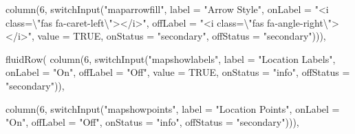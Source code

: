 \documentclass[
]{article}
\newenvironment{Shaded}{\begin{snugshade}}{\end{snugshade}}
\newcommand{\AttributeTok}[1]{\textcolor[rgb]{0.77,0.63,0.00}{#1}}
\newcommand{\ConstantTok}[1]{\textcolor[rgb]{0.00,0.00,0.00}{#1}}
\newcommand{\DecValTok}[1]{\textcolor[rgb]{0.00,0.00,0.81}{#1}}
\newcommand{\FunctionTok}[1]{\textcolor[rgb]{0.00,0.00,0.00}{#1}}
\newcommand{\NormalTok}[1]{#1}
\newcommand{\SpecialCharTok}[1]{\textcolor[rgb]{0.00,0.00,0.00}{#1}}
\newcommand{\StringTok}[1]{\textcolor[rgb]{0.31,0.60,0.02}{#1}}
\begin{document}
\begin{Shaded}
\begin{Highlighting}[]
                                        \FunctionTok{column}\NormalTok{(}\DecValTok{6}\NormalTok{, }\FunctionTok{switchInput}\NormalTok{(}\StringTok{"maparrowfill"}\NormalTok{,}
                                                              \AttributeTok{label =} \StringTok{"Arrow Style"}\NormalTok{,}
                                                              \AttributeTok{onLabel =} \StringTok{"\textless{}i class=}\SpecialCharTok{\textbackslash{}"}\StringTok{fas fa{-}caret{-}left}\SpecialCharTok{\textbackslash{}"}\StringTok{\textgreater{}\textless{}/i\textgreater{}"}\NormalTok{,}
                                                              \AttributeTok{offLabel =} \StringTok{"\textless{}i class=}\SpecialCharTok{\textbackslash{}"}\StringTok{fas fa{-}angle{-}right}\SpecialCharTok{\textbackslash{}"}\StringTok{\textgreater{}\textless{}/i\textgreater{}"}\NormalTok{,}
                                                              \AttributeTok{value =} \ConstantTok{TRUE}\NormalTok{,}
                                                              \AttributeTok{onStatus =} \StringTok{"secondary"}\NormalTok{,}
                                                              \AttributeTok{offStatus =} \StringTok{"secondary"}\NormalTok{))),}

                                      \FunctionTok{fluidRow}\NormalTok{(}
                                        \FunctionTok{column}\NormalTok{(}\DecValTok{6}\NormalTok{, }\FunctionTok{switchInput}\NormalTok{(}\StringTok{"mapshowlabels"}\NormalTok{,}
                                                              \AttributeTok{label =} \StringTok{"Location Labels"}\NormalTok{,}
                                                              \AttributeTok{onLabel =} \StringTok{"On"}\NormalTok{,}
                                                              \AttributeTok{offLabel =} \StringTok{"Off"}\NormalTok{,}
                                                              \AttributeTok{value =} \ConstantTok{TRUE}\NormalTok{,}
                                                              \AttributeTok{onStatus =} \StringTok{"info"}\NormalTok{,}
                                                              \AttributeTok{offStatus =} \StringTok{"secondary"}\NormalTok{)),}

                                        \FunctionTok{column}\NormalTok{(}\DecValTok{6}\NormalTok{, }\FunctionTok{switchInput}\NormalTok{(}\StringTok{"mapshowpoints"}\NormalTok{,}
                                                              \AttributeTok{label =} \StringTok{"Location Points"}\NormalTok{,}
                                                              \AttributeTok{onLabel =} \StringTok{"On"}\NormalTok{,}
                                                              \AttributeTok{offLabel =} \StringTok{"Off"}\NormalTok{,}
                                                              \AttributeTok{onStatus =} \StringTok{"info"}\NormalTok{,}
                                                              \AttributeTok{offStatus =} \StringTok{"secondary"}\NormalTok{))),}


\end{Highlighting}
\end{Shaded}
\end{document}

